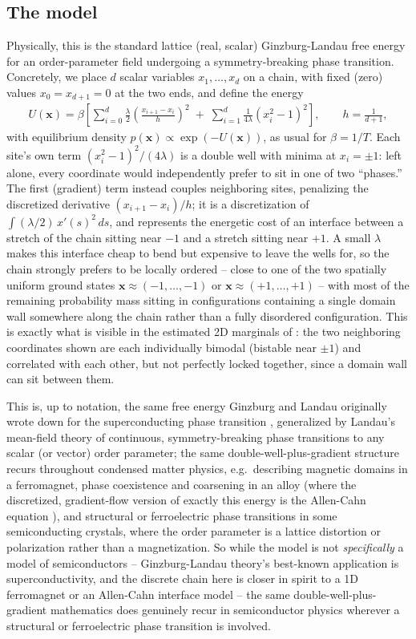\documentclass[11pt]{amsart}
\begin{document}
\subsection{The model}
Physically, this is the standard lattice (real, scalar) Ginzburg-Landau free energy for an order-parameter field undergoing a symmetry-breaking phase transition. Concretely, we place $d$ scalar variables $x_1,\ldots,x_d$ on a chain, with fixed (zero) values $x_0=x_{d+1}=0$ at the two ends, and define the energy
\begin{align}
    U(\boldsymbol{x}) = \beta\left[\sum_{i=0}^{d}\frac{\lambda}{2}\left(\frac{x_{i+1}-x_i}{h}\right)^2 \;+\; \sum_{i=1}^d \frac{1}{4\lambda}(x_i^2-1)^2\right], \qquad h = \frac{1}{d+1},
\end{align}
with equilibrium density $p(\boldsymbol{x})\propto\exp(-U(\boldsymbol{x}))$, as usual for $\beta=1/T$. Each site's own term $(x_i^2-1)^2/(4\lambda)$ is a double well with minima at $x_i=\pm1$: left alone, every coordinate would independently prefer to sit in one of two ``phases.'' The first (gradient) term instead couples neighboring sites, penalizing the discretized derivative $(x_{i+1}-x_i)/h$; it is a discretization of $\int(\lambda/2)\,x'(s)^2\,ds$, and represents the energetic cost of an interface between a stretch of the chain sitting near $-1$ and a stretch sitting near $+1$. A small $\lambda$ makes this interface cheap to bend but expensive to leave the wells for, so the chain strongly prefers to be locally ordered -- close to one of the two spatially uniform ground states $\boldsymbol{x}\approx(-1,\ldots,-1)$ or $\boldsymbol{x}\approx(+1,\ldots,+1)$ -- with most of the remaining probability mass sitting in configurations containing a single domain wall somewhere along the chain rather than a fully disordered configuration. This is exactly what is visible in the estimated 2D marginals of : the two neighboring coordinates shown are each individually bimodal (bistable near $\pm1$) and correlated with each other, but not perfectly locked together, since a domain wall can sit between them.

This is, up to notation, the same free energy Ginzburg and Landau originally wrote down for the superconducting phase transition \cite{ginzburglandau}, generalized by Landau's mean-field theory of continuous, symmetry-breaking phase transitions to any scalar (or vector) order parameter; the same double-well-plus-gradient structure recurs throughout condensed matter physics, e.g.\ describing magnetic domains in a ferromagnet, phase coexistence and coarsening in an alloy (where the discretized, gradient-flow version of exactly this energy is the Allen-Cahn equation \cite{allencahn}), and structural or ferroelectric phase transitions in some semiconducting crystals, where the order parameter is a lattice distortion or polarization rather than a magnetization. So while the model is not \emph{specifically} a model of semiconductors -- Ginzburg-Landau theory's best-known application is superconductivity, and the discrete chain here is closer in spirit to a 1D ferromagnet or an Allen-Cahn interface model -- the same double-well-plus-gradient mathematics does genuinely recur in semiconductor physics wherever a structural or ferroelectric phase transition is involved.
\end{document}
